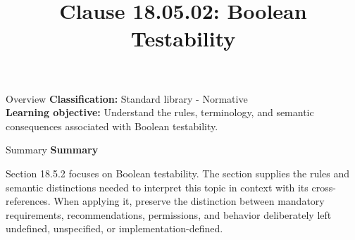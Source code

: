 \documentclass[10pt,letterpaper]{article}
\title{Clause 18.05.02: Boolean Testability}
\author{}
\date{}
\begin{document}
\maketitle
\begin{CornellOverviewBox}{Overview}
\textbf{Classification:} Standard library - Normative\\[2pt]
\textbf{Learning objective:} Understand the rules, terminology, and semantic consequences associated with Boolean testability.
\end{CornellOverviewBox}\begin{CornellSummaryBox}{Summary}
{\sffamily\bfseries\color{Accent} Summary}\par\vspace{3pt}Section 18.5.2 focuses on Boolean testability. The section supplies the rules and semantic distinctions needed to interpret this topic in context with its cross-references. When applying it, preserve the distinction between mandatory requirements, recommendations, permissions, and behavior deliberately left undefined, unspecified, or implementation-defined.
\end{CornellSummaryBox}
\end{document}
